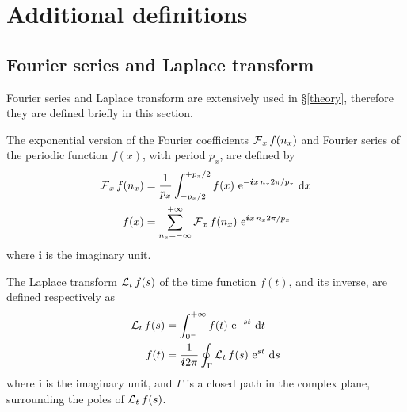 

\section{Additional definitions}

\subsection{Fourier series and Laplace transform}
\label{transforms}

Fourier series and Laplace transform are extensively used in \S\ref{theory},
therefore they are defined briefly in this section.

\begin{definicion}
	The exponential version of the Fourier coefficients $\operatorname{\mathcal{F}}_{x} f(n_{x})$
	and Fourier series of the periodic function $f(x)$, with period $p_{x}$,
	are defined by
	\begin{subequations}
		\label{transforms:eqn:fourier}
		\begin{align}
			\operatorname{\mathcal{F}}_{x} f(n_{x}) &= \frac{1}{p_{x}}
			\int_{-p_{x}/2}^{+p_{x}/2} f(x)\, \operatorname{e}^{-\bm{i} x\, n_{x} 2\pi/p_{x}} \,\mathrm{d}x
			\\
			f(x) &= \sum_{n_{x} = -\infty}^{+\infty} \operatorname{\mathcal{F}}_{x} f(n_{x})\,
			\operatorname{e}^{\bm{i} x\, n_{x} 2\pi/p_{x}}
		\end{align}
	\end{subequations}
	where $\bm{i}$ is the imaginary unit.
\end{definicion}

\begin{definicion}
	The Laplace transform $\operatorname{\mathcal{L}}_{t} f(s)$ of the time function $f(t)$,
	and its inverse, are defined respectively as
	\begin{subequations}
		\begin{align}
			\operatorname{\mathcal{L}}_{t} f(s) &= \int_{0^{-}}^{+\infty} f(t)\, \operatorname{e}^{-st} \,\mathrm{d}t
			\\
			f(t) &= \frac{1}{\bm{i} 2\pi} \oint_{\Gamma} \operatorname{\mathcal{L}}_{t} f(s)\, \operatorname{e}^{st} \,\mathrm{d}s
		\end{align}
	\end{subequations}
	where $\bm{i}$ is the imaginary unit,
	and $\Gamma$ is a closed path in the complex plane,
	surrounding the poles of $\operatorname{\mathcal{L}}_{t} f(s)$.
\end{definicion}
